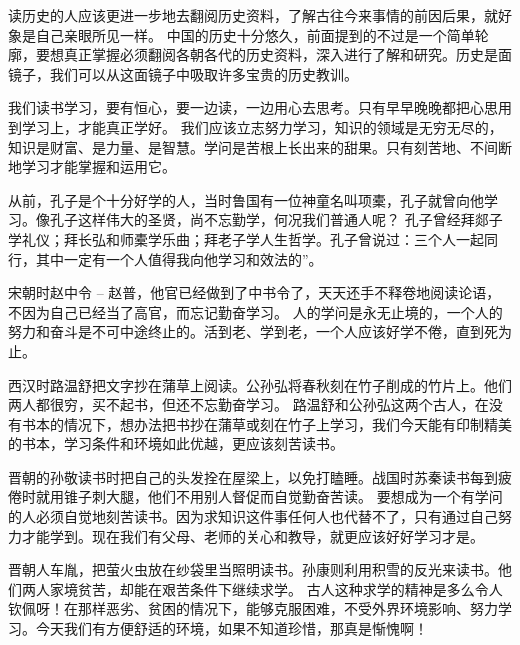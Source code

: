 \documentclass[avery5371,grid]{flashcards}
\begin{document}
{读历史的人应该更进一步地去翻阅历史资料，了解古往今来事情的前因后果，就好象是自己亲眼所见一样。} %
{中国的历史十分悠久，前面提到的不过是一个简单轮廓，要想真正掌握必须翻阅各朝各代的历史资料，深入进行了解和研究。历史是面镜子，我们可以从这面镜子中吸取许多宝贵的历史教训。} %

{我们读书学习，要有恒心，要一边读，一边用心去思考。只有早早晚晚都把心思用到学习上，才能真正学好。} %
{我们应该立志努力学习，知识的领域是无穷无尽的，知识是财富、是力量、是智慧。学问是苦根上长出来的甜果。只有刻苦地、不间断地学习才能掌握和运用它。} %

{从前，孔子是个十分好学的人，当时鲁国有一位神童名叫项橐，孔子就曾向他学习。像孔子这样伟大的圣贤，尚不忘勤学，何况我们普通人呢？} %
{孔子曾经拜郯子学礼仪；拜长弘和师橐学乐曲；拜老子学人生哲学。孔子曾说过：三个人一起同行，其中一定有一个人值得我向他学习和效法的”。} %

{宋朝时赵中令 -- 赵普，他官已经做到了中书令了，天天还手不释卷地阅读论语，不因为自己已经当了高官，而忘记勤奋学习。} %
{人的学问是永无止境的，一个人的努力和奋斗是不可中途终止的。活到老、学到老，一个人应该好学不倦，直到死为止。} %

{西汉时路温舒把文字抄在蒲草上阅读。公孙弘将春秋刻在竹子削成的竹片上。他们两人都很穷，买不起书，但还不忘勤奋学习。} %
{路温舒和公孙弘这两个古人，在没有书本的情况下，想办法把书抄在蒲草或刻在竹子上学习，我们今天能有印制精美的书本，学习条件和环境如此优越，更应该刻苦读书。} %

{晋朝的孙敬读书时把自己的头发拴在屋梁上，以免打瞌睡。战国时苏秦读书每到疲倦时就用锥子刺大腿，他们不用别人督促而自觉勤奋苦读。} %
{要想成为一个有学问的人必须自觉地刻苦读书。因为求知识这件事任何人也代替不了，只有通过自己努力才能学到。现在我们有父母、老师的关心和教导，就更应该好好学习才是。} %

{晋朝人车胤，把萤火虫放在纱袋里当照明读书。孙康则利用积雪的反光来读书。他们两人家境贫苦，却能在艰苦条件下继续求学。} %
{古人这种求学的精神是多么令人钦佩呀！在那样恶劣、贫困的情况下，能够克服困难，不受外界环境影响、努力学习。今天我们有方便舒适的环境，如果不知道珍惜，那真是惭愧啊！} %
\end{document}
